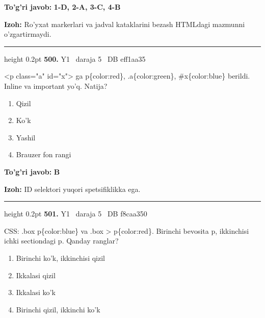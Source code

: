 \documentclass[10pt,a4paper,oneside]{article}
\begin{document}
\begin{tcolorbox}[enhanced,breakable,colback=teal!4,colframe=teal!45!black,boxrule=0.45pt,arc=1.2mm,left=2.8mm,right=2.8mm,top=2mm,bottom=2mm,before skip=2mm,after skip=2mm]
\textbf{\color{teal}To'g'ri javob:} \textbf{1-D, 2-A, 3-C, 4-B}
\par\smallskip
\textbf{Izoh:} Ro'yxat markerlari va jadval kataklarini bezash HTMLdagi mazmunni o'zgartirmaydi.
\end{tcolorbox}
\vspace{2mm}\hrule height 0.2pt \vspace{4mm}
\hypertarget{q500}{\textbf{\color{ink}500.}}  {\color{muted}\scriptsize Y1 \textbullet\ daraja 5 \textbullet\ DB eff1aa35}
\par
\textless{}p class="a" id="x"\textgreater{} ga p\{color:red\}, .a\{color:green\}, \#x\{color:blue\} berildi. Inline va important yo'q. Natija?
\begin{enumerate}[label=\Alph*),leftmargin=9mm]
\item Qizil
\item Ko'k
\item Yashil
\item Brauzer fon rangi
\end{enumerate}
\begin{tcolorbox}[enhanced,breakable,colback=teal!4,colframe=teal!45!black,boxrule=0.45pt,arc=1.2mm,left=2.8mm,right=2.8mm,top=2mm,bottom=2mm,before skip=2mm,after skip=2mm]
\textbf{\color{teal}To'g'ri javob:} \textbf{B}
\par\smallskip
\textbf{Izoh:} ID selektori yuqori spetsifiklikka ega.
\end{tcolorbox}
\vspace{2mm}\hrule height 0.2pt \vspace{4mm}
\hypertarget{q501}{\textbf{\color{ink}501.}}  {\color{muted}\scriptsize Y1 \textbullet\ daraja 5 \textbullet\ DB f8caa350}
\par
CSS: .box p\{color:blue\} va .box \textgreater{} p\{color:red\}. Birinchi bevosita p, ikkinchisi ichki sectiondagi p. Qanday ranglar?
\begin{enumerate}[label=\Alph*),leftmargin=9mm]
\item Birinchi ko'k, ikkinchisi qizil
\item Ikkalasi qizil
\item Ikkalasi ko'k
\item Birinchi qizil, ikkinchi ko'k
\end{enumerate}
\end{document}
